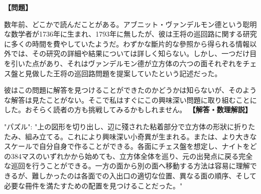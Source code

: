 \documentclass[10pt,a4paper,oneside,openany]{ltjsbook}
\begin{document}
\begin{tcolorbox}[colback=softblue,colframe=primaryblue,title=\textbf{第 340 問：THE CUBIC KNIGHT'S TOUR.},arc=2mm,boxrule=1pt,breakable]
\textbf{【問題】}\par\vspace{0.3em}
数年前、どこかで読んだことがある。アブニット・ヴァンデルモン德という聡明な数学者が1736年に生まれ、1793年に無したが、彼は王将の巡回路に関する研究に多くの時間を費やしていたようだ。わずかな斷片的な參照から得られる情報以外では、その研究の詳細や結果については詳しく知らない。しかし、一つだけ目を引いた点があり、それはヴァンデルモン德が立方体の六つの面それぞれをチェス盤と見做した王将の巡回路問題を提案していたという記述だった。

彼はこの問題に解答を見つけることができたのかどうかは知らないが、そのような解答は見たことがない。そこで私はすぐにこの興味深い問題に取り組むことにした。おそらく読者の方も挑戦してみるかもしれません。
\tcblower
\textbf{【解答・数理解説】}\par\vspace{0.3em}
{
"パズル": "上の図形を切り出し、辺に殘された粘着部分で立方体の形狀に折りたたみ、組み立てる。これにより興味深い小奇異が生まれる。または、より大きなスケールで自分自身で作ることができる。各面にチェス盤を想定し、ナイトをどの384マスのいずれかから始めても、立方体全体を巡り、元の出発点に戻る完全な巡回を行うことができる。一方の面から別の面へ移動する方法は容易に理解できるが、難しかったのは各面での入出口の適切な位置、異なる面の順序、そして必要な冊件を満たすための配置を見つけることだった。"
}
\end{tcolorbox}
\end{document}
